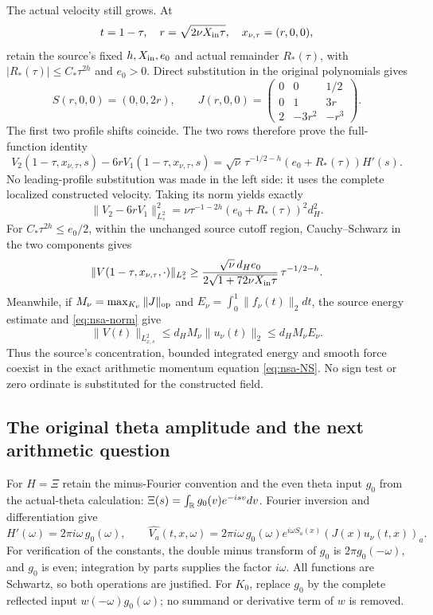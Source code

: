 The actual velocity still grows. At
\[
 t=1-\tau,\quad r=\sqrt{2\nu X_{\rm in}\tau},\quad
 x_{\nu,\tau}=(r,0,0),
\]
retain the source's fixed \(h,X_{\rm in},e_0\) and actual remainder
\(R_*(\tau)\), with
\(|R_*(\tau)|\leq C_*\tau^{2h}\) and \(e_0>0\).
Direct substitution in the original polynomials gives
\[
 S(r,0,0)=(0,0,2r),\qquad
 J(r,0,0)=
 \begin{pmatrix}0&0&1/2\\0&1&3r\\2&-3r^2&-r^3\end{pmatrix}.
\]
The first two profile shifts coincide. The two rows therefore prove
the full-function identity
\begin{equation}\label{eq:nsa-actualgrowth}
 V_2(1-\tau,x_{\nu,\tau},s)-6rV_1(1-\tau,x_{\nu,\tau},s)
 =\sqrt\nu\,\tau^{-1/2-h}(e_0+R_*(\tau))H'(s).
\end{equation}
No leading-profile substitution was made in the left side: it uses
the complete localized constructed velocity. Taking its norm yields
exactly
\[
 \|V_2-6rV_1\|_{L^2_s}^2
     =\nu\tau^{-1-2h}(e_0+R_*(\tau))^2d_H^2 .
\]
For \(C_*\tau^{2h}\leq e_0/2\), within the unchanged source cutoff
region, Cauchy--Schwarz in the two components gives
\[
 \|V(1-\tau,x_{\nu,\tau},\cdot)\|_{L^2_s}
 \geq
 \frac{\sqrt\nu\,d_He_0}{2\sqrt{1+72\nu X_{\rm in}\tau}}\,
                  \tau^{-1/2-h}.
\]
Meanwhile, if \(M_\nu=\max_{K_\nu}\|J\|_{\rm op}\) and
\(E_\nu=\int_0^1\|f_\nu(t)\|_2dt\), the source energy estimate and
\eqref{eq:nsa-norm} give
\[
 \|V(t)\|_{L^2_{x,s}}\leq d_HM_\nu\|u_\nu(t)\|_2
                         \leq d_HM_\nu E_\nu .
\]
Thus the source's concentration, bounded integrated energy and smooth
force coexist in the exact arithmetic momentum equation
\eqref{eq:nsa-NS}. No sign test or zero ordinate is substituted for
the constructed field.

\subsection{The original theta amplitude and the next arithmetic question}

For \(H=\Xi\) retain the minus-Fourier convention and the even theta
input \(g_0\) from the actual-theta calculation:
\(\Xi(s)=\int_\mathbb R g_0(v)e^{-isv}dv\).
Fourier inversion and differentiation give
\[
 \widehat{H'}(\omega)=2\pi i\omega\,g_0(\omega),\qquad
 \widehat{V_a}(t,x,\omega)
 =2\pi i\omega\,g_0(\omega)
               e^{i\omega S_a(x)}(J(x)u_\nu(t,x))_a .
\]
For verification of the constants, the double minus transform of
\(g_0\) is \(2\pi g_0(-\omega)\), and \(g_0\) is even; integration
by parts supplies the factor \(i\omega\). All functions are Schwartz,
so both operations are justified. For \(K_0\), replace \(g_0\) by
the complete reflected input \(w(-\omega)g_0(\omega)\); no summand
or derivative term of \(w\) is removed.

